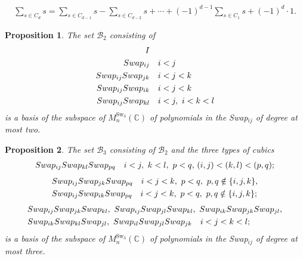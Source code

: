\documentclass[10pt,a4paper]{amsart}
\newtheorem{proposition}{Proposition}
\begin{document}
    \begin{align}\label{eq:qdit-rel}
	\sum_{s \in C_d} s = \sum_{s \in C_{d-1}} s - \sum_{s \in C_{d-2}} s + \cdots + (-1)^{d-1} \sum_{s \in C_1} s + (-1)^d \cdot 1.
\end{align}

\begin{proposition}\label{propo: 2-indep}
	The set $\mathcal{B}_2$ consisting of
	\begin{align*}
		I& \\
		\textnormal{Swap}_{ij}& \quad i < j\\
		\textnormal{Swap}_{ij} \textnormal{Swap}_{jk}& \quad i < j < k\\
		\textnormal{Swap}_{ij} \textnormal{Swap}_{ik}& \quad i < j < k\\
		\textnormal{Swap}_{ij} \textnormal{Swap}_{kl}& \quad i < j, \  i < k < l
	\end{align*}
is a basis of the subspace of $M^{\text{Sw}_3}_n(\mathbb{C})$ of polynomials in the Swap$_{ij}$ of degree at most two.
\end{proposition}

\begin{proposition}\label{prop: indep3}
	The set $\mathcal{B}_3$ consisting of $\mathcal{B}_2$ and the three types of cubics
	\begin{equation}\label{eq: type 6}
		\begin{split}
		&\textnormal{Swap}_{ij} \textnormal{Swap}_{kl} \textnormal{Swap}_{pq} \quad 
		i < j, \ k < l,\  p < q,  \, (i,j) < (k,l) < (p,q);\\
	\end{split}
\end{equation}
\begin{equation}\label{eq: type 5}
	\begin{split}
		&\textnormal{Swap}_{ij} \textnormal{Swap}_{jk} \textnormal{Swap}_{pq} \quad i < j < k,\  p<q,\ p,q \notin \{i,j,k\},\\
		&\textnormal{Swap}_{ij} \textnormal{Swap}_{ik} \textnormal{Swap}_{pq} \quad i < j < k,\ p<q, \ p,q \notin \{i,j,k\};\\
		\end{split}
	\end{equation}
\begin{equation}\label{eq: type 4}
	\begin{split}
	&\textnormal{Swap}_{ij} \textnormal{Swap}_{jk} \textnormal{Swap}_{kl}, \ 
	\textnormal{Swap}_{ij} \textnormal{Swap}_{jl} \textnormal{Swap}_{kl},\ 
	\textnormal{Swap}_{ik} \textnormal{Swap}_{jk} \textnormal{Swap}_{jl},\\
	&\textnormal{Swap}_{ik} \textnormal{Swap}_{kl} \textnormal{Swap}_{jl},\ 
	\textnormal{Swap}_{il} \textnormal{Swap}_{jl} \textnormal{Swap}_{jk}
	\quad i < j < k < l;\\		
\end{split}
\end{equation}
	is a basis of the subspace of $M^{\text{Sw}_3}_n(\mathbb{C})$ of polynomials in the Swap$_{ij}$ of degree at most three. 
\end{proposition}
\end{document}
